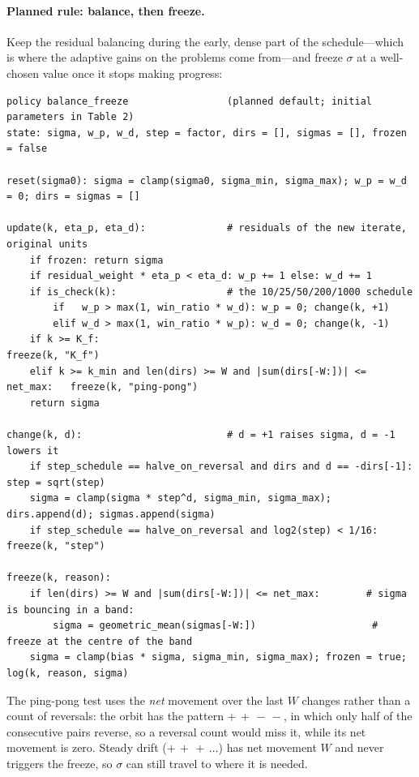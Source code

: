 \documentclass[11pt]{article}
\begin{document}
\paragraph{Planned rule: balance, then freeze.} Keep the residual balancing during the early, dense part
of the schedule---which is where the adaptive gains on the  problems come from---and freeze
$\sigma$ at a well-chosen value once it stops making progress:
\begin{lstlisting}[style=plain]
policy balance_freeze                 (planned default; initial parameters in Table 2)
state: sigma, w_p, w_d, step = factor, dirs = [], sigmas = [], frozen = false

reset(sigma0): sigma = clamp(sigma0, sigma_min, sigma_max); w_p = w_d = 0; dirs = sigmas = []

update(k, eta_p, eta_d):              # residuals of the new iterate, original units
    if frozen: return sigma
    if residual_weight * eta_p < eta_d: w_p += 1 else: w_d += 1
    if is_check(k):                   # the 10/25/50/200/1000 schedule
        if   w_p > max(1, win_ratio * w_d): w_p = 0; change(k, +1)
        elif w_d > max(1, win_ratio * w_p): w_d = 0; change(k, -1)
    if k >= K_f:                                              freeze(k, "K_f")
    elif k >= k_min and len(dirs) >= W and |sum(dirs[-W:])| <= net_max:   freeze(k, "ping-pong")
    return sigma

change(k, d):                         # d = +1 raises sigma, d = -1 lowers it
    if step_schedule == halve_on_reversal and dirs and d == -dirs[-1]: step = sqrt(step)
    sigma = clamp(sigma * step^d, sigma_min, sigma_max); dirs.append(d); sigmas.append(sigma)
    if step_schedule == halve_on_reversal and log2(step) < 1/16: freeze(k, "step")

freeze(k, reason):
    if len(dirs) >= W and |sum(dirs[-W:])| <= net_max:        # sigma is bouncing in a band:
        sigma = geometric_mean(sigmas[-W:])                    # freeze at the centre of the band
    sigma = clamp(bias * sigma, sigma_min, sigma_max); frozen = true; log(k, reason, sigma)
\end{lstlisting}
The ping-pong test uses the \emph{net} movement over the last $W$ changes rather than a count of reversals:
the  orbit has the pattern $+\,+\,-\,-$, in which only half of the consecutive pairs reverse, so a
reversal count would miss it, while its net movement is zero. Steady drift ($+\,+\,+\,\dots$) has net movement $W$
and never triggers the freeze, so $\sigma$ can still travel to where it is needed.
\end{document}
